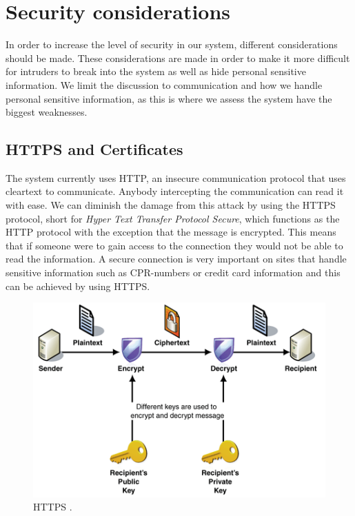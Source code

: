 \section{Security considerations}
In order to increase the level of security in our system, different considerations should be made. These considerations are made in order to make it more difficult for intruders to break into the system as well as hide personal sensitive information. We limit the discussion to communication and how we handle personal sensitive information, as this is where we assess the system have the biggest weaknesses.
 

\subsection*{HTTPS and Certificates} 
The system currently uses HTTP, an insecure communication protocol that uses cleartext to communicate. Anybody intercepting the communication can read it with ease. We can diminish the damage from this attack by using the HTTPS protocol, short for \textit{Hyper Text Transfer Protocol Secure}, which functions as the HTTP protocol with the exception that the message is encrypted. This means that if someone were to gain access to the connection they would not be able to read the information. A secure connection is very important on sites that handle sensitive information such as CPR-numbers or credit card information and this can be achieved by using HTTPS\cite{HTTPS}.

\begin{figure}[ht]
	\begin{center}
		\includegraphics[scale=0.9]{graphics/HTTPS.png}
		\caption{HTTPS \cite{https_pic}.}
		\label{fig:HTTPS}
	\end{center} 
\end{figure}

